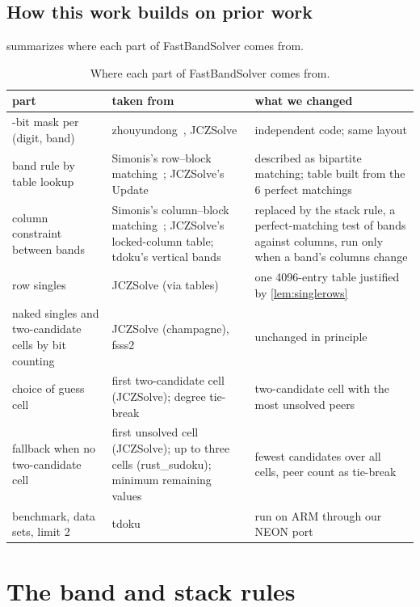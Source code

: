 \documentclass[11pt]{article}
\theoremstyle{definition}
\theoremstyle{plain}
\begin{document}
\subsection{How this work builds on prior work}

 summarizes where each part of FastBandSolver comes from.

\begin{table}[t]
\centering
\caption{Where each part of FastBandSolver comes from.}
\label{tab:lineage}
\small
\renewcommand{\arraystretch}{1.25}
\begin{tabular}{>{\raggedright\arraybackslash}p{3.3cm}>{\raggedright\arraybackslash}p{4.6cm}>{\raggedright\arraybackslash}p{6.0cm}}
\toprule
part & taken from & what we changed \\
\midrule
27-bit mask per (digit, band) & zhouyundong~\cite{zhouyundong2012solver}, JCZSolve~\cite{jczsolve2016} & independent code; same layout \\
band rule by table lookup & Simonis's row--block matching~\cite{simonis2005sudoku}; JCZSolve's Update & described as bipartite matching; table built from the 6 perfect matchings \\
column constraint between bands & Simonis's column--block matching~\cite{simonis2005sudoku}; JCZSolve's locked-column table; tdoku's vertical bands & replaced by the stack rule, a perfect-matching test of bands against columns, run only when a band's columns change \\
row singles & JCZSolve (via tables) & one 4096-entry table justified by \cref{lem:singlerows} \\
naked singles and two-candidate cells by bit counting & JCZSolve (champagne), fsss2 & unchanged in principle \\
choice of guess cell & first two-candidate cell (JCZSolve); degree tie-break~\cite{brelaz1979new} & two-candidate cell with the most unsolved peers \\
fallback when no two-candidate cell & first unsolved cell (JCZSolve); up to three cells (rust\_sudoku); minimum remaining values~\cite{haralick1980increasing} & fewest candidates over all cells, peer count as tie-break \\
benchmark, data sets, limit 2 & tdoku~\cite{dillon2019nerdsniped} & run on ARM through our NEON port~\cite{kelly2026tdokuarm} \\
\bottomrule
\end{tabular}
\end{table}

\section{The band and stack rules}
\label{sec:rules}
\end{document}
